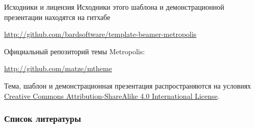 \documentclass[12pt]{beamer}
\begin{document}
\begin{frame}{Исходники и лицензия}
Исходники этого шаблона и демонстрационной презентации находятся на гитхабе

\begin{center}\url{http://github.com/bardsoftware/template-beamer-metropolis}\end{center}

Официальный репозиторий темы Metropolis:

\begin{center}\url{http://github.com/matze/mtheme}\end{center}

Тема, шаблон и демонстрационная презентация распространяются на условиях
\href{http://creativecommons.org/licenses/by-sa/4.0/}{Creative Commons
Attribution-ShareAlike 4.0 International License}.

\begin{center}\ccbysa\end{center}

\end{frame}


\begin{frame}[allowframebreaks]
\frametitle{Список литературы}
\nocite{*}



\end{frame}
\end{document}
